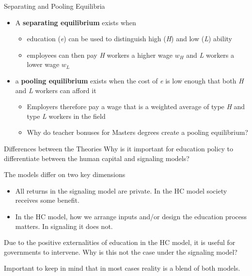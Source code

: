 \documentclass{beamer}
\begin{document}
\begin{frame}[<+->]{Separating and Pooling Equilibria}
    \begin{itemize}
        \item A \textbf{separating equilibrium} exists when 
        \begin{itemize}
            \item education (\textit{e}) can be used to distinguish high (\textit{H}) and low (\textit{L}) ability
            \item employees can then pay \textit{H} workers a higher wage $w_H$ and \textit{L} workers a lower wage $w_L$
        \end{itemize}
        \item a \textbf{pooling equilibrium} exists when the cost of \textit{e} is low enough that both \textit{H} and \textit{L} workers can afford it
        \begin{itemize}
            \item Employers therefore pay a wage that is a weighted average of type \textit{H} and type \textit{L} workers in the field
            \item Why do teacher  bonuses for Masters degrees create a pooling equilibrium?
        \end{itemize}
    
    \end{itemize}
\end{frame}


\begin{frame}{Differences between the Theories}
    Why is it important for education policy to differentiate between the human capital and signaling models? \medskip

    The models differ on two key dimensions
    \begin{itemize}
        \item All returns in the signaling model are private. In the HC model society receives some benefit.
        \item In the HC model, how we arrange inputs and/or design the education process matters. In signaling it does not.
    \end{itemize}
    \medskip
    Due to the positive externalities of education in the HC model, it is useful for governments to intervene. Why is this not the case under the signaling model? 
    \medskip
    
    Important to keep in mind that in most cases reality is a blend of both models.
    
\end{frame}
\end{document}
